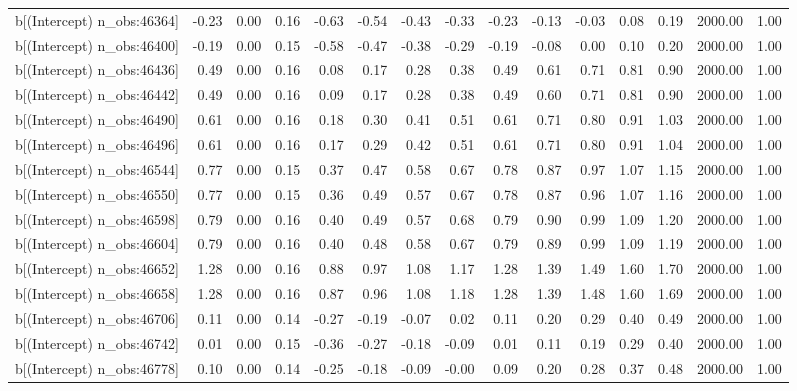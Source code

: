 \begin{table}[ht]
\begin{tabular}{rrrrrrrrrrrrrrr}
  b[(Intercept) n\_obs:46364] & -0.23 & 0.00 & 0.16 & -0.63 & -0.54 & -0.43 & -0.33 & -0.23 & -0.13 & -0.03 & 0.08 & 0.19 & 2000.00 & 1.00 \\ 
  b[(Intercept) n\_obs:46400] & -0.19 & 0.00 & 0.15 & -0.58 & -0.47 & -0.38 & -0.29 & -0.19 & -0.08 & 0.00 & 0.10 & 0.20 & 2000.00 & 1.00 \\ 
  b[(Intercept) n\_obs:46436] & 0.49 & 0.00 & 0.16 & 0.08 & 0.17 & 0.28 & 0.38 & 0.49 & 0.61 & 0.71 & 0.81 & 0.90 & 2000.00 & 1.00 \\ 
  b[(Intercept) n\_obs:46442] & 0.49 & 0.00 & 0.16 & 0.09 & 0.17 & 0.28 & 0.38 & 0.49 & 0.60 & 0.71 & 0.81 & 0.90 & 2000.00 & 1.00 \\ 
  b[(Intercept) n\_obs:46490] & 0.61 & 0.00 & 0.16 & 0.18 & 0.30 & 0.41 & 0.51 & 0.61 & 0.71 & 0.80 & 0.91 & 1.03 & 2000.00 & 1.00 \\ 
  b[(Intercept) n\_obs:46496] & 0.61 & 0.00 & 0.16 & 0.17 & 0.29 & 0.42 & 0.51 & 0.61 & 0.71 & 0.80 & 0.91 & 1.04 & 2000.00 & 1.00 \\ 
  b[(Intercept) n\_obs:46544] & 0.77 & 0.00 & 0.15 & 0.37 & 0.47 & 0.58 & 0.67 & 0.78 & 0.87 & 0.97 & 1.07 & 1.15 & 2000.00 & 1.00 \\ 
  b[(Intercept) n\_obs:46550] & 0.77 & 0.00 & 0.15 & 0.36 & 0.49 & 0.57 & 0.67 & 0.78 & 0.87 & 0.96 & 1.07 & 1.16 & 2000.00 & 1.00 \\ 
  b[(Intercept) n\_obs:46598] & 0.79 & 0.00 & 0.16 & 0.40 & 0.49 & 0.57 & 0.68 & 0.79 & 0.90 & 0.99 & 1.09 & 1.20 & 2000.00 & 1.00 \\ 
  b[(Intercept) n\_obs:46604] & 0.79 & 0.00 & 0.16 & 0.40 & 0.48 & 0.58 & 0.67 & 0.79 & 0.89 & 0.99 & 1.09 & 1.19 & 2000.00 & 1.00 \\ 
  b[(Intercept) n\_obs:46652] & 1.28 & 0.00 & 0.16 & 0.88 & 0.97 & 1.08 & 1.17 & 1.28 & 1.39 & 1.49 & 1.60 & 1.70 & 2000.00 & 1.00 \\ 
  b[(Intercept) n\_obs:46658] & 1.28 & 0.00 & 0.16 & 0.87 & 0.96 & 1.08 & 1.18 & 1.28 & 1.39 & 1.48 & 1.60 & 1.69 & 2000.00 & 1.00 \\ 
  b[(Intercept) n\_obs:46706] & 0.11 & 0.00 & 0.14 & -0.27 & -0.19 & -0.07 & 0.02 & 0.11 & 0.20 & 0.29 & 0.40 & 0.49 & 2000.00 & 1.00 \\ 
  b[(Intercept) n\_obs:46742] & 0.01 & 0.00 & 0.15 & -0.36 & -0.27 & -0.18 & -0.09 & 0.01 & 0.11 & 0.19 & 0.29 & 0.40 & 2000.00 & 1.00 \\ 
  b[(Intercept) n\_obs:46778] & 0.10 & 0.00 & 0.14 & -0.25 & -0.18 & -0.09 & -0.00 & 0.09 & 0.20 & 0.28 & 0.37 & 0.48 & 2000.00 & 1.00 \\ 

\end{tabular}
\end{table}
